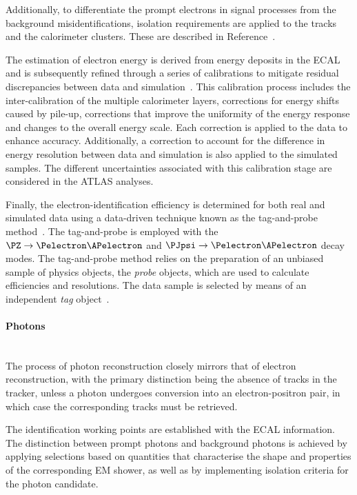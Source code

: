 Additionally, to differentiate the prompt electrons in signal processes from the background misidentifications,
isolation requirements are applied to the tracks and the calorimeter clusters. These are described in Reference~\cite{PERF-2017-01}.


The estimation of electron energy is derived from energy deposits in the ECAL and is 
subsequently refined through a series of calibrations to mitigate residual discrepancies 
between data and simulation~\cite{ATLAS:2014bzw}.
This calibration process includes the inter-calibration of the multiple calorimeter layers, 
corrections for energy shifts caused by pile-up, corrections that improve the uniformity 
of the energy response and changes to the overall energy scale.
Each correction is applied to the data to enhance accuracy.
Additionally, a correction to account for the difference in energy resolution between 
data and simulation is also applied to the simulated samples. 
The different uncertainties associated with this calibration stage are considered in the ATLAS analyses.

Finally, the electron-identification efficiency is determined for both real and simulated data using a
data-driven technique known as the tag-and-probe method~\cite{ATLAS:2011len}. The tag-and-probe is employed with  
the $\PZ \rightarrow \Pelectron \APelectron$ 
and $\PJpsi \rightarrow \Pelectron \APelectron$ decay modes. 
The tag-and-probe method relies on the preparation of an unbiased sample of physics objects, the \textit{probe} 
objects, which are used to calculate efficiencies and resolutions. The data sample is selected by means of an independent
\textit{tag} object~\cite{Straessner:1354502}.


\paragraph{Photons}\mbox{}\\
The process of photon reconstruction closely mirrors that of electron reconstruction, 
with the primary distinction being the absence of tracks in the tracker, 
unless a photon undergoes conversion into an electron-positron pair,
in which case the corresponding tracks must be retrieved.

The identification working points are established with the ECAL information.
The distinction between prompt photons and background photons is achieved 
by applying selections based on quantities that characterise the shape and 
properties of the corresponding EM shower, as well as by 
implementing isolation criteria for the photon candidate.

